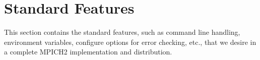 \documentclass{article}
\def\fixme#1{\marginpar{FIXME:}\textbf{FIXME: #1}}
\begin{document}






\section{Standard Features}
\label{sec:standard-features}
This section contains the standard features, such as command line
handling, environment variables, configure options for error checking,
etc., that we desire in a complete MPICH2 implementation and distribution.



\end{document}
